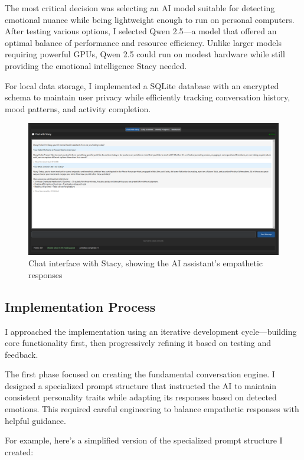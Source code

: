 \documentclass[12pt]{article}
\begin{document}
The most critical decision was selecting an AI model suitable for detecting emotional nuance while being lightweight enough to run on personal computers. After testing various options, I selected Qwen 2.5—a model that offered an optimal balance of performance and resource efficiency. Unlike larger models requiring powerful GPUs, Qwen 2.5 could run on modest hardware while still providing the emotional intelligence Stacy needed.

For local data storage, I implemented a SQLite database with an encrypted schema to maintain user privacy while efficiently tracking conversation history, mood patterns, and activity completion.

\begin{figure}[H]
  \centering
  \includegraphics[width=1\textwidth]{../images/Chat.png}
  \caption{Chat interface with Stacy, showing the AI assistant's empathetic responses}
\end{figure}

\subsection{Implementation Process}

I approached the implementation using an iterative development cycle—building core functionality first, then progressively refining it based on testing and feedback.

The first phase focused on creating the fundamental conversation engine. I designed a specialized prompt structure that instructed the AI to maintain consistent personality traits while adapting its responses based on detected emotions. This required careful engineering to balance empathetic responses with helpful guidance.

For example, here's a simplified version of the specialized prompt structure I created:
\end{document}
